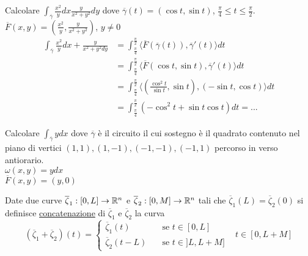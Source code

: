 	
\begin{exbar}
\begin{example}
	Calcolare $\int_{\overline{\gamma}}\frac{x^2}{y}dx \frac{y}{x^2+y^2}dy$ dove $\overline{\gamma}(t)=(\cos t , \sin t)$, $\frac{\pi}{4}\leq t \leq \frac{\pi}{2}$.\\
	$\overline{F}(x,y)=\left( \frac{x^2}{y}, \frac{y}{x^2+y^2} \right)$, $y\neq 0$
	\begin{align*}
		\int_{\overline{\gamma}}\frac{x^2}{y}dx + \frac{ y}{x^2+y^2 dy} &= \int_{\frac{\pi}{4}}^{\frac{\pi}{2}}\langle \overline{F}(\overline{\gamma}(t)),\overline{\gamma}'(t) \rangle dt\\
		&=\int_{\frac{\pi}{4}}^{\frac{\pi}{2}}\langle \overline{F}(\cos t , \sin t), \overline{\gamma}'(t) \rangle dt\\
		&= \int_{\frac{\pi}{4}}^{\frac{\pi}{2}}\langle \left( \frac{\cos^2 t}{\sin t}, \sin t \right), \left( -\sin t, \cos t \right) \rangle dt\\
		&=\int_{\frac{\pi}{4}}^{\frac{\pi}{2}}(-\cos^2 t+\sin t \cos t)dt=...
	\end{align*}
\end{example}
\end{exbar}


\begin{exbar}
\begin{example}
	\label{ex: pag 458}	
	Calcolare $\int_{\overline{\gamma}}y dx$ dove $\overline{\gamma}$ è il circuito il cui sostegno è il quadrato contenuto nel piano di vertici $(1,1),(1,-1),(-1,-1),(-1,1)$ percorso in verso antiorario. \\
	$\omega(x,y)= y dx$\\
	$\overline{F}(x,y)=(y,0)$\\
	
	\segnaposto %
\end{example}
\end{exbar}


\begin{definition}
	Date due curve $\overline{\zeta}_1:[0,L]\rightarrow \mathbb{R}^n$ e $\overline{\zeta}_2:[0,M]\rightarrow \mathbb{R}^n$ tali che $\overline{\zeta}_1(L)=\overline{\zeta}_2(0)$ si definisce \underline{concatenazione} di $\overline{\zeta}_1$ e $\overline{\zeta}_2$ la curva 
	\begin{equation*}
		(\overline{\zeta}_1+\overline{\zeta}_2)(t)=\begin{cases}
			\overline{\zeta}_1 (t)\,\,\,\, &\text{  se  } t\in[0,L]\\
			\overline{\zeta}_2 (t-L) \,\,\,\, &\text{  se  } t \in ]L,L+M]
		\end{cases}\,\,\,\,\, t \in [0,L+M]
	\end{equation*}
	
	\segnaposto %
\end{definition}


